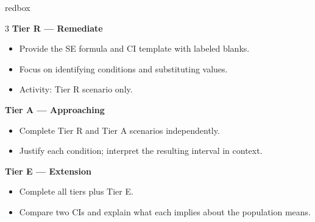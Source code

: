 \documentclass[10pt]{article}
\begin{document}
\begin{skillbox}{redbox}
\begin{multicols}{3}
    \textbf{Tier R --- Remediate}
    \begin{itemize}
        \item Provide the SE formula and CI template with labeled blanks.
        \item Focus on identifying conditions and substituting values.
        \item Activity: Tier R scenario only.
    \end{itemize}
    \columnbreak
    \textbf{Tier A --- Approaching}
    \begin{itemize}
        \item Complete Tier R and Tier A scenarios independently.
        \item Justify each condition; interpret the resulting interval in context.
    \end{itemize}
    \columnbreak
    \textbf{Tier E --- Extension}
    \begin{itemize}
        \item Complete all tiers plus Tier E.
        \item Compare two CIs and explain what each implies about the population means.
    \end{itemize}
\end{multicols}
\end{skillbox}
\end{document}
